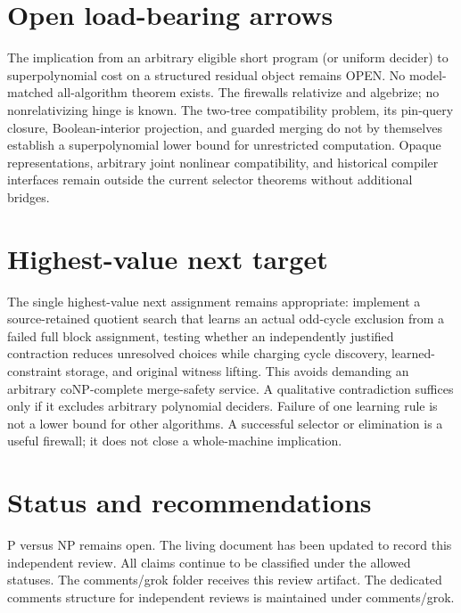 \documentclass[11pt]{article}
\begin{document}
\section{Open load-bearing arrows}
The implication from an arbitrary eligible short program (or uniform decider) to superpolynomial cost on a structured residual object remains OPEN. No model-matched all-algorithm theorem exists. The firewalls relativize and algebrize; no nonrelativizing hinge is known. The two-tree compatibility problem, its pin-query closure, Boolean-interior projection, and guarded merging do not by themselves establish a superpolynomial lower bound for unrestricted computation. Opaque representations, arbitrary joint nonlinear compatibility, and historical compiler interfaces remain outside the current selector theorems without additional bridges.

\section{Highest-value next target}
The single highest-value next assignment remains appropriate: implement a source-retained quotient search that learns an actual odd-cycle exclusion from a failed full block assignment, testing whether an independently justified contraction reduces unresolved choices while charging cycle discovery, learned-constraint storage, and original witness lifting. This avoids demanding an arbitrary coNP-complete merge-safety service. A qualitative contradiction suffices only if it excludes arbitrary polynomial deciders. Failure of one learning rule is not a lower bound for other algorithms. A successful selector or elimination is a useful firewall; it does not close a whole-machine implication.

\section{Status and recommendations}
P versus NP remains open. The living document has been updated to record this independent review. All claims continue to be classified under the allowed statuses. The comments/grok folder receives this review artifact. The dedicated comments structure for independent reviews is maintained under comments/grok.

\end{document}
